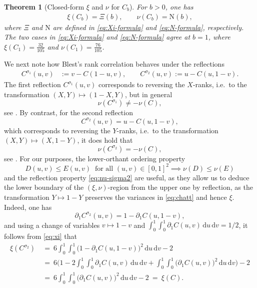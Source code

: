\documentclass{article}
\newtheorem{theorem}{Theorem}[section]
\newcommand{\1}{\mathds{1}}
\newcommand{\de}{\mathrm{\,d}}
\newcommand{\NN}{\mathrm{N}}
\begin{document}
\begin{theorem}[Closed-form \(\xi\) and \(\nu\) for $C_b$]\label{thm:closed}
For \(b>0\), one has
\begin{align}\label{eq:xi_nu_formulas}
\xi(C_b) = \Xi(b),\qquad \nu(C_b) = \NN(b),
\end{align}
where $\Xi$ and $\NN$ are defined in \eqref{eq:Xi-formula} and \eqref{eq:N-formula}, respectively.
The two cases in \eqref{eq:Xi-formula} and \eqref{eq:N-formula} agree at \(b=1\), where \(\xi(C_1)=\frac{32}{105}\) and \(\nu(C_1)=\frac{76}{105}\).
\end{theorem}

We next note how Blest's rank correlation behaves under the reflections
\begin{align}\label{itm:concordance_reflections}
C^{\sigma_1}(u,v) &:= v - C(1-u,v),
\qquad C^{\sigma_2}(u,v) := u - C(u,1-v).
\end{align}
The first reflection $C^{\sigma_1}(u,v)$ corresponds to reversing the $X$-ranks, i.e.\ to the transformation $(X,Y)\mapsto(1-X,Y)$, but in general
\[
\nu(C^{\sigma_1})\ne-\nu(C),
\]
see \cite[Exa.~4]{genest2003blests}.
By contrast, for the second reflection
\[
C^{\sigma_2}(u,v)=u-C(u,1-v),
\]
which corresponds to reversing the $Y$-ranks, i.e.\ to the transformation $(X,Y)\mapsto(X,1-Y)$, it does hold that
\begin{equation}\label{eq:nu-sigma2}
\nu(C^{\sigma_2})=-\nu(C),
\end{equation}
see \cite{tschimpke2025exact}.
For our purposes, the lower-orthant ordering property
\[
D(u,v)\le E(u,v)\ \text{ for all }(u,v)\in[0,1]^2\implies \nu(D)\le \nu(E)
\]
and the reflection property \eqref{eq:nu-sigma2} are useful, as they allow us to deduce the lower boundary of the $(\xi,\nu)$-region from the upper one by reflection, as the transformation $Y\mapsto 1-Y$ preserves the variances in \eqref{eq:chatt} and hence $\xi$.
Indeed, one has
\[
\partial_1 C^{\sigma_2}(u,v) = 1 - \partial_1 C(u,1-v),
\]
and using a change of variables $v\mapsto 1-v$ and $\int_0^1\int_0^1 \partial_1 C(u,v)\de u\de v=1/2$, it follows from \eqref{eq:xi} that
\begin{align*}
\xi(C^{\sigma_2})
~ &= ~ 6 \int_0^1 \!\!\int_0^1 \bigl(1 - \partial_1 C(u,1-v)\bigr)^2 \de u \de v - 2 \\[4pt]
&= ~ 6 \Biggl( 1 - 2 \!\int_0^1 \!\!\int_0^1 \partial_1 C(u,v) \de u \de v
   + \!\int_0^1 \!\!\int_0^1 \bigl(\partial_1 C(u,v)\bigr)^2 \de u \de v \Biggr) - 2 \\[4pt]
&= ~ 6 \!\int_0^1 \!\!\int_0^1 \bigl(\partial_1 C(u,v)\bigr)^2 \de u \de v - 2
~=~\xi(C).
\end{align*}
\end{document}
